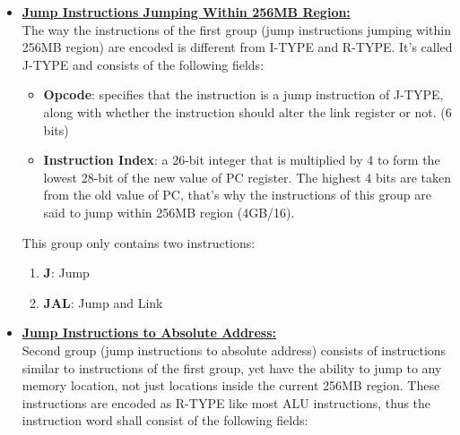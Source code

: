 \documentclass[oneside]{book}
\begin{document}
\begin{itemize}

\item \textbf{\underline{Jump Instructions Jumping Within 256MB Region:}} \\

The way the instructions of the first group (jump instructions jumping
within 256MB region) are encoded is different from I-TYPE and R-TYPE. It's
called J-TYPE and consists of the following fields:

\begin{itemize}

\item \textbf{Opcode}: specifies that the instruction is a jump instruction
                       of J-TYPE, along with whether the instruction
                       should alter the link register or not. (6 bits)

\item \textbf{Instruction Index}: a 26-bit integer that is multiplied by 4
                                  to form the lowest 28-bit of the new value
                                  of PC register. The highest 4 bits are taken
                                  from the old value of PC, that's why the
                                  instructions of this group are said to
                                  jump within 256MB region (4GB/16).

\end{itemize}

This group only contains two instructions:

\begin{enumerate}

\item \textbf{J}:   Jump
\item \textbf{JAL}: Jump and Link

\end{enumerate}

\item \textbf{\underline{Jump Instructions to Absolute Address:}} \\

Second group (jump instructions to absolute address) consists of instructions
similar to instructions of the first group, yet have the ability to jump
to any memory location, not just locations inside the current 256MB region.
These instructions are encoded as R-TYPE like most ALU instructions, thus
the instruction word shall consist of the following fields:


\end{itemize}
\end{document}
